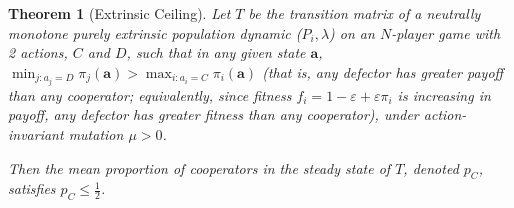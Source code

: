 \documentclass{article}
\newtheorem{theorem}{Theorem}
\begin{document}
\begin{framed}
\begin{theorem}[Extrinsic Ceiling]

    Let \(T\) be the transition matrix of a neutrally monotone purely extrinsic
    population dynamic (\(P_i, \lambda\)) on an \(N\)-player game with 2
    actions, \(C\) and \(D\), such that in any given state \(\mathbf{a}\),
    \(\min_{j: a_j = D} \pi_j(\mathbf{a}) > \max_{i: a_i = C}
    \pi_i(\mathbf{a})\) (that is, any defector has greater payoff than any
    cooperator; equivalently, since fitness \(f_i = 1 - \varepsilon +
    \varepsilon \pi_i\) is increasing in payoff, any defector has greater
    fitness than any cooperator), under action-invariant mutation \(\mu > 0\).

    Then the mean proportion of cooperators in the steady state of \(T\), denoted \(p_C\),
    satisfies \(p_C \leq \frac{1}{2}\).
    \label{prop:ceiling}
\end{theorem}
\end{framed}
\end{document}

